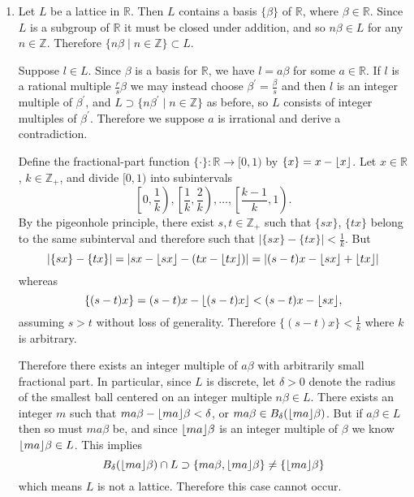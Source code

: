 \documentclass{article}
\DeclarePairedDelimiter\floor{\lfloor}{\rfloor}
\begin{document}
\begin{Answer}
  \begin{enumerate}
    \item{
      Let $L$ be a lattice in $\mathbb{R}$. Then $L$ contains a basis
      $\{ \beta \}$ of $\mathbb{R}$, where $\beta \in
      \mathbb{R}$. Since $L$ is a subgroup of $\mathbb{R}$ it must be
      closed under addition, and so $n \beta \in L$ for any $n \in \mathbb{Z}$.
      Therefore $\{ n \beta \mid n \in \mathbb{Z} \} \subset L$.

      Suppose $l \in L$. Since $\beta$ is a basis for $\mathbb{R}$, we
      have $l = a \beta$ for some $a \in \mathbb{R}$. If $l$ is a
      rational multiple $\frac{r}{s}\beta$ we may
      instead choose $\beta^\prime = \frac{\beta}{s}$ and then $l$ is
      an integer multiple of $\beta^\prime$, and
      $L \supset \{ n \beta^\prime \mid n \in \mathbb{Z} \}$ as
      before, so $L$ consists of integer multiples of $\beta^\prime$.
      Therefore we suppose  $a$ is irrational and derive a contradiction.

      Define the fractional-part function $\{ \cdot \} : \mathbb{R}
      \to [0,1)$ by $\{ x \} = x - \floor{x}$.
      Let $x \in \mathbb{R}$,
      $k \in \mathbb{Z}_+$, and divide $[0,1)$ into subintervals
      $$
      \left[ 0, \frac{1}{k} \right),
      \left[ \frac{1}{k}, \frac{2}{k} \right),
      \dots,
      \left[ \frac{k-1}{k}, 1 \right).
      $$
      By the pigeonhole principle, there exist $s, t \in \mathbb{Z}_+$
      such that $\{ s x \}$, $\{ t x \}$ belong to the same
      subinterval and therefore such that
      $|\{ s x \} - \{t x\}| < \frac{1}{k}$. But
      $$
      |\{ s x \} - \{t x\}|
        = |s x - \floor{s x} - (tx - \floor{t x})|
        = |(s - t)x - \floor{s x} + \floor{t x}|
      $$
      whereas
      $$
      \{ (s - t)x \}
        = (s - t)x - \floor{(s - t)x}
        < (s - t)x - \floor{s x},
      $$
      assuming $s > t$ without loss of generality. Therefore
      $\{ (s - t)x \} < \frac{1}{k}$ where $k$ is arbitrary.

      Therefore there exists an integer multiple of $a \beta$ with arbitrarily
      small fractional part.
      In particular, since $L$ is discrete, let $\delta > 0$ denote the radius of the
      smallest ball centered on an integer multiple $n \beta \in L$.
      There exists an integer $m$ such that
      $m a \beta - \floor{m a} \beta < \delta$, or
      $m a \beta \in B_{\delta}(\floor{m a} \beta)$.
      But if $a \beta \in L$ then so must $m a \beta$ be,
      and since $\floor{m a} \beta$ is an integer multiple of $\beta$
      we know $\floor{m a} \beta \in L$. This implies
      $$
      B_{\delta}(\floor{m a} \beta) \cap L \supset \{ m a \beta,
      \floor{m a} \beta \} \neq \{ \floor{m a} \beta \}
      $$
      which means $L$ is not a lattice. Therefore this case cannot occur.

}
\end{enumerate}
\end{Answer}
\end{document}
